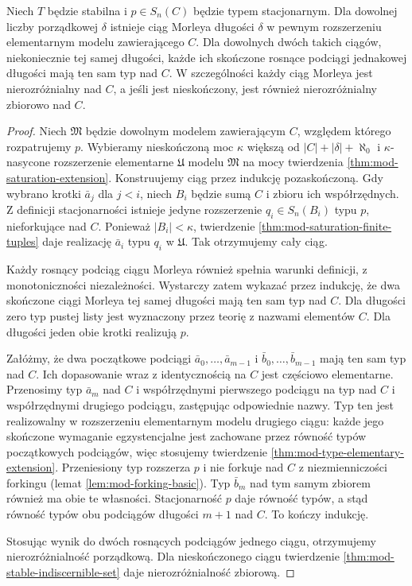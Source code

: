 \begin{twierdzenie}
\label{thm:mod-morley-sequence-existence}
Niech $T$ będzie stabilna i $p\in S_n(C)$
będzie typem stacjonarnym.
Dla dowolnej liczby porządkowej $\delta$
istnieje ciąg Morleya długości $\delta$
w pewnym rozszerzeniu elementarnym
modelu zawierającego $C$.
Dla dowolnych dwóch takich ciągów,
niekoniecznie tej samej długości, każde ich
skończone rosnące podciągi jednakowej długości
mają ten sam typ nad $C$.
W szczególności każdy ciąg Morleya
jest nierozróżnialny nad $C$, a jeśli
jest nieskończony, jest również
nierozróżnialny zbiorowo nad $C$.
\end{twierdzenie}
\begin{proof}
Niech $\mathfrak M$ będzie dowolnym modelem
zawierającym $C$, względem którego rozpatrujemy $p$.
Wybieramy nieskończoną moc $\kappa$
większą od $|C|+|\delta|+\aleph_0$
i $\kappa$-nasycone rozszerzenie elementarne
$\mathfrak U$ modelu $\mathfrak M$ na mocy
twierdzenia \ref{thm:mod-saturation-extension}.
Konstruujemy ciąg przez indukcję
pozaskończoną. Gdy wybrano krotki
$\bar a_j$ dla $j<i$, niech $B_i$
będzie sumą $C$ i zbioru ich współrzędnych.
Z definicji stacjonarności istnieje
jedyne rozszerzenie $q_i\in S_n(B_i)$
typu $p$, nieforkujące nad $C$.
Ponieważ $|B_i|<\kappa$, twierdzenie
\ref{thm:mod-saturation-finite-tuples}
daje realizację $\bar a_i$ typu $q_i$
w $\mathfrak U$. Tak otrzymujemy cały ciąg.

Każdy rosnący podciąg ciągu Morleya
również spełnia warunki definicji,
z monotoniczności niezależności.
Wystarczy zatem wykazać przez indukcję,
że dwa skończone ciągi Morleya tej samej
długości mają ten sam typ nad $C$.
Dla długości zero typ pustej listy jest wyznaczony
przez teorię z nazwami elementów $C$.
Dla długości jeden obie krotki realizują $p$.

Załóżmy, że dwa początkowe podciągi
$\bar a_0,\ldots,\bar a_{m-1}$ i
$\bar b_0,\ldots,\bar b_{m-1}$
mają ten sam typ nad $C$.
Ich dopasowanie wraz z identycznością na $C$
jest częściowo elementarne.
Przenosimy typ $\bar a_m$ nad $C$
i współrzędnymi pierwszego podciągu
na typ nad $C$ i współrzędnymi drugiego
podciągu, zastępując odpowiednie nazwy.
Typ ten jest realizowalny w rozszerzeniu
elementarnym modelu drugiego ciągu:
każde jego skończone wymaganie
egzystencjalne jest zachowane przez
równość typów początkowych podciągów,
więc stosujemy twierdzenie
\ref{thm:mod-type-elementary-extension}.
Przeniesiony typ rozszerza $p$
i nie forkuje nad $C$ z niezmienniczości
forkingu (lemat \ref{lem:mod-forking-basic}).
Typ $\bar b_m$ nad tym samym zbiorem
również ma obie te własności.
Stacjonarność $p$ daje równość typów,
a stąd równość typów obu podciągów
długości $m+1$ nad $C$.
To kończy indukcję.

Stosując wynik do dwóch rosnących
podciągów jednego ciągu, otrzymujemy
nierozróżnialność porządkową.
Dla nieskończonego ciągu twierdzenie
\ref{thm:mod-stable-indiscernible-set}
daje nierozróżnialność zbiorową.
\end{proof}


